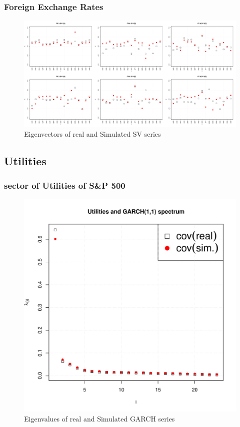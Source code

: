 \documentclass{beamer}
\begin{document}
\begin{frame}
  \frametitle{Foreign Exchange Rates}
  \begin{figure}[htb!]
    \centering
    \includegraphics[width=1.0\linewidth]{FX_sv_eigenvectors.pdf}
    \caption{\scriptsize Eigenvectors of real and Simulated SV series}
  \end{figure}
\end{frame}
  
\subsection{Utilities}
\begin{frame}
  \frametitle{sector of Utilities of S\&P 500}
  \begin{figure}[htb!]
    \centering
    \includegraphics[scale=0.35]{Utilities_eigenvalues.pdf}
    \caption{\scriptsize Eigenvalues of real and Simulated GARCH series}
  \end{figure}
\end{frame}
\end{document}
